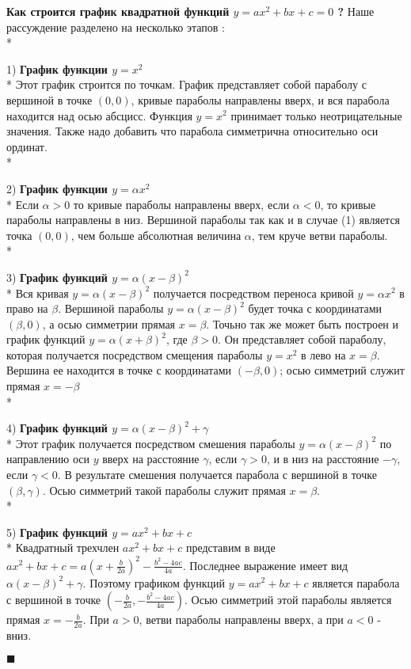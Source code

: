 \documentclass{amsart}
\begin{document}
\textbf{Как строится график квадратной функций $y=ax^2+bx+c=0$ ?} Наше рассуждение разделено на несколько этапов :\\*

1) \textbf{График функции $y=x^2$} \\*
Этот график строится по точкам. График представляет собой параболу с вершиной в точке $(0,0)$, кривые параболы направлены вверх, и вся парабола находится над осью абсцисс. Функция $y=x^2$ принимает только неотрицательные значения. Также надо добавить что парабола симметрична относительно оси ординат. \\*

2) \textbf{График функции $y=\alpha x^2$ } \\*
Если $\alpha > 0$ то кривые параболы направлены вверх, если $\alpha < 0$, то кривые параболы направлены в низ. Вершиной параболы так как и в случае (1) является точка $(0,0)$, чем больше абсолютная величина $\alpha$, тем круче ветви параболы. \\*

3) \textbf{График функций $y = \alpha (x - \beta)^2$} \\*
Вся кривая $y = \alpha (x - \beta)^2$ получается посредством переноса кривой $y=\alpha x^2$ в право на $\beta$. Вершиной параболы $y = \alpha (x - \beta)^2$ будет точка с координатами $(\beta,0)$, а осью симметрии прямая $x=\beta$. Точьно так же может быть построен и график функций $y = \alpha (x + \beta)^2$, где $\beta > 0$. Он представляет собой параболу, которая получается посредством смещения параболы $y=x^2$ в лево на $x=\beta$. Вершина ее находится в точке с координатами $(-\beta,0)$; осью симметрий служит прямая $x=-\beta$ \\*

4) \textbf{График функций $y = \alpha (x - \beta)^2 + \gamma$} \\*
Этот график получается посредством смешения параболы $y = \alpha (x - \beta)^2$ по направлению оси $y$ вверх на расстояние $\gamma$, если $\gamma > 0$, и в низ на расстояние $-\gamma$, если $\gamma < 0$. В результате смешения получается парабола с вершиной в точке $(\beta,\gamma)$. Осью симметрий такой параболы служит прямая $x = \beta$. \\*

5) \textbf{График функций $y = ax^2+bx+c$} \\*
Квадратный трехчлен $ax^2+bx+c$ представим в виде $ax^2+bx+c = a(x+\frac{b}{2a})^2 - \frac{b^2 - 4ac}{4a}$. Последнее выражение имеет вид $\alpha (x - \beta)^2 + \gamma$. Поэтому графиком функций $y = ax^2+bx+c$ является парабола с вершиной в точке $(-\frac{b}{2a}, -\frac{b^2-4ac}{4a})$. Осью симметрий этой параболы является прямая $x = -\frac{b}{2a}$. При $a>0$, ветви параболы направлены вверх, а при $a<0$ - вниз.

$\blacksquare$
\end{document}
